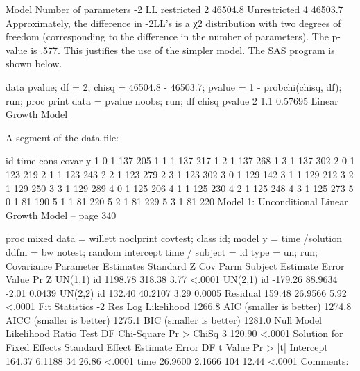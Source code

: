 Model	Number of parameters	-2 LL
restricted	2	46504.8
Unrestricted	4	46503.7
Approximately, the difference in -2LL's is a χ2 distribution with two degrees of freedom (corresponding to the difference in the number of parameters). The p-value is .577. This justifies the use of the simpler model. The SAS program is shown below.

data pvalue;
  df = 2; chisq = 46504.8 - 46503.7;
  pvalue = 1 - probchi(chisq, df);
run;
proc print data = pvalue noobs;
run;
df    chisq     pvalue
 2     1.1     0.57695
Linear Growth Model

A segment of the data file:

id    time    cons    covar     y
 1      0       1      137     205
 1      1       1      137     217
 1      2       1      137     268
 1      3       1      137     302
 2      0       1      123     219
 2      1       1      123     243
 2      2       1      123     279
 2      3       1      123     302
 3      0       1      129     142
 3      1       1      129     212
 3      2       1      129     250
 3      3       1      129     289
 4      0       1      125     206
 4      1       1      125     230
 4      2       1      125     248
 4      3       1      125     273
 5      0       1       81     190
 5      1       1       81     220
 5      2       1       81     229
 5      3       1       81     220
Model 1: Unconditional Linear Growth Model -- page 340

proc mixed data = willett noclprint covtest;
  class id;
  model y = time /solution ddfm = bw notest;
  random intercept time / subject = id type = un;
run;
                  Covariance Parameter Estimates
                                    Standard         Z
Cov Parm     Subject    Estimate       Error     Value        Pr Z
UN(1,1)      id          1198.78      318.38      3.77      <.0001
UN(2,1)      id          -179.26     88.9634     -2.01      0.0439
UN(2,2)      id           132.40     40.2107      3.29      0.0005
Residual                  159.48     26.9566      5.92      <.0001
           Fit Statistics
-2 Res Log Likelihood          1266.8
AIC (smaller is better)        1274.8
AICC (smaller is better)       1275.1
BIC (smaller is better)        1281.0
  Null Model Likelihood Ratio Test
    DF    Chi-Square      Pr > ChiSq
     3        120.90          <.0001
                   Solution for Fixed Effects
                         Standard
Effect       Estimate       Error      DF    t Value    Pr > |t|
Intercept      164.37      6.1188      34      26.86      <.0001
time          26.9600      2.1666     104      12.44      <.0001
Comments:

